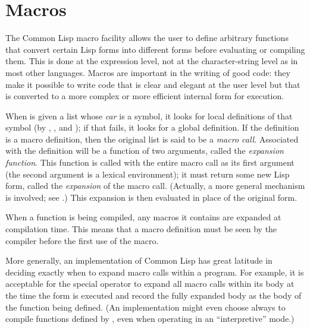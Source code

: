 
\clearpage\def\pagestatus{ULTIMATE}

\ifx \rulang\Undef

\chapter{Macros}
\label{MACROS}

The Common Lisp macro facility allows the user to define arbitrary
functions that convert certain Lisp forms into different forms before
evaluating or compiling them.  This is done at the expression level,
not at the character-string level as in most other languages.  Macros
are important in the writing of good code: they make it possible to
write code that is clear and elegant at the user level but that is
converted to a more complex or more efficient internal form for
execution.

When  is given a list whose \emph{car} is a symbol, it looks
for local definitions of that symbol (by , ,
and ); if that fails, it looks for a global definition.
If the definition is a macro definition, then the original
list is said to be a \emph{macro call}.  Associated with the definition
will be a function of two arguments, called the \emph{expansion function}.
This function is called with the entire macro call as its first argument
(the second argument is a lexical environment);
it must return some new Lisp form, called the \emph{expansion} of the
macro call.  (Actually, a more general mechanism is involved;
see .)
This expansion is then evaluated in place of the original
form.

When a function is being compiled, any macros it contains are expanded
at compilation time.  This means that a macro definition must be seen by the
compiler before the first use of the macro.

More generally, an implementation of Common Lisp has great latitude in deciding
exactly when to expand macro calls within a program.  For example,
it is acceptable for the  special operator to expand all macro
calls within its body at the time the  form is executed
and record the fully expanded body as the body of the function
being defined.
(An implementation might even choose always to compile functions defined
by , even when operating in an ``interpretive'' mode.)

